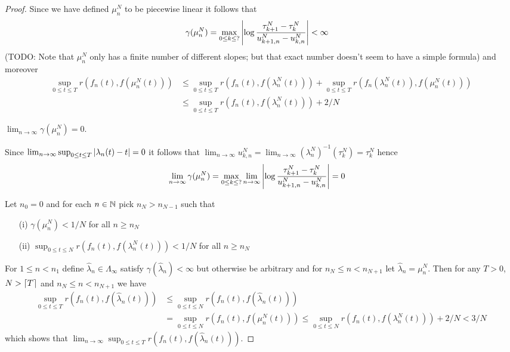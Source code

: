 \begin{proof}
Since we have defined $\mu^N_n$ to be piecewise linear it follows that
\begin{align*}
\gamma(\mu^N_n) &= \max_{0 \leq k \leq ?} \left \vert \log \frac{\tau^N_{k+1} - \tau^N_k}{u^N_{k+1,n} - u^N_{k,n}}  \right \vert < \infty
\end{align*}
(TODO: Note that $\mu^N_n$ only has a finite number of different slopes; but that exact number doesn't seem to have a simple formula)
and moreover
\begin{align*}
\sup_{0 \leq t \leq T} r(f_n(t), f(\mu^N_n(t))) &\leq \sup_{0 \leq t \leq T} r(f_n(t), f(\lambda^N_n(t))) + \sup_{0 \leq t \leq T} r(f_n(\lambda^N_n(t)), f(\mu^N_n(t))) \\
&\leq \sup_{0 \leq t \leq T} r(f_n(t), f(\lambda^N_n(t))) + 2/N
\end{align*}

\begin{clm}$\lim_{n \to \infty} \gamma(\mu^N_n) = 0$.
\end{clm}
Since $\lim_{n \to \infty} \sup_{0 \leq t \leq T} \left \vert \lambda_n(t) - t \right \vert = 0$ it follows that $\lim_{n \to \infty} u^N_{k,n} = \lim_{n \to \infty}  (\lambda^N_n)^{-1}(\tau^N_k) = \tau^N_k$ hence
\begin{align*}
\lim_{n \to \infty} \gamma(\mu^N_n) &= \max_{0 \leq k \leq ?} \lim_{n \to \infty} \left \vert \log \frac{\tau^N_{k+1} - \tau^N_k}{u^N_{k+1,n} - u^N_{k,n}}  \right \vert = 0
\end{align*}

Let $n_0 =0$ and for each $n \in \mathbb{N}$ pick $n_N > n_{N-1}$ such that 
\begin{itemize}
\item[(i)] $\gamma(\mu^N_n) < 1/N$ for all $n \geq n_N$
\item[(ii)] $\sup_{0 \leq t \leq N} r(f_n(t), f(\lambda^N_n(t))) < 1/N$ for all $n \geq n_N$
\end{itemize}

For $1 \leq n < n_1$ define $\hat{\lambda}_n \in \Lambda_\infty$ satisfy $\gamma(\hat{\lambda}_n) < \infty$ but otherwise be arbitrary and for $n_N \leq n < n_{N+1}$ let $\hat{\lambda}_n = \mu^N_n$.  Then for any $T>0$, $N > \lceil T \rceil$ and $n_N \leq n < n_{N+1}$ we have 
\begin{align*}
\sup_{0\leq t \leq T} r(f_n(t), f(\hat{\lambda}_n(t))) &\leq \sup_{0\leq t \leq N} r(f_n(t), f(\hat{\lambda}_n(t))) \\
&=\sup_{0\leq t \leq N} r(f_n(t), f(\mu^N_n(t)))  \leq \sup_{0\leq t \leq N} r(f_n(t), f(\lambda^N_n(t))) + 2/N < 3/N
\end{align*}
which shows that $\lim_{n \to \infty} \sup_{0\leq t \leq T} r(f_n(t), f(\hat{\lambda}_n(t)))$.


\end{proof}

